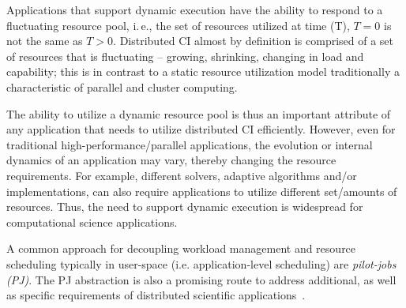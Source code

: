 \documentclass[]{svjour3}
\begin{document}




Applications that support dynamic execution have the ability to
respond to a fluctuating resource pool, i.\,e., the set of resources
utilized at time (T), $T=0$ is not the same as $T>0$. Distributed CI
almost by definition is comprised of a set of resources that is
fluctuating -- growing, shrinking, changing in load and capability;
this is in contrast to a static resource utilization model
traditionally a characteristic of parallel and cluster computing.

The ability to utilize a dynamic resource pool is thus an important
attribute of any application that needs to utilize distributed CI
efficiently.  However, even for traditional high-performance/parallel
applications, the evolution or internal dynamics of an application may
vary, thereby changing the resource requirements.  For example,
different solvers, adaptive algorithms and/or implementations, can
also require applications to utilize different set/amounts of
resources.  Thus, the need to support dynamic execution is widespread
for computational science applications.

A common approach for decoupling workload management and resource
scheduling typically in user-space (i.e. application-level scheduling)
are \emph{pilot-jobs (PJ)}.  The PJ abstraction is also a promising
route to address additional, as well as specific requirements of
distributed scientific
applications~\cite{ko-efficient,bigjob_cloudcom10}.
 
\end{document}
